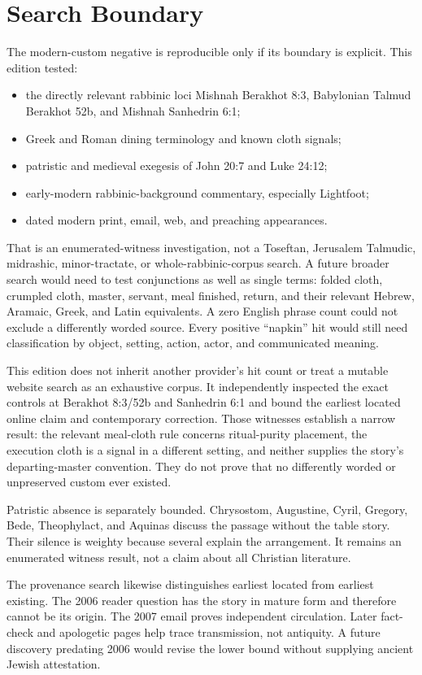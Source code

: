 \section{Search Boundary}

The modern-custom negative is reproducible only if its boundary is explicit.
This edition tested:

\begin{itemize}
\item the directly relevant rabbinic loci Mishnah Berakhot 8:3, Babylonian
Talmud Berakhot 52b, and Mishnah Sanhedrin 6:1;
\item Greek and Roman dining terminology and known cloth signals;
\item patristic and medieval exegesis of John 20:7 and Luke 24:12;
\item early-modern rabbinic-background commentary, especially Lightfoot;
\item dated modern print, email, web, and preaching appearances.
\end{itemize}

That is an enumerated-witness investigation, not a Toseftan, Jerusalem
Talmudic, midrashic, minor-tractate, or whole-rabbinic-corpus search. A future
broader search would need to test conjunctions as well as single terms:
folded cloth, crumpled cloth, master, servant, meal finished, return, and their
relevant Hebrew, Aramaic, Greek, and Latin equivalents. A zero English phrase
count could not exclude a differently worded source. Every positive
``napkin'' hit would still need classification by object, setting, action,
actor, and communicated meaning.

This edition does not inherit another provider's hit count or treat a mutable
website search as an exhaustive corpus. It independently inspected the exact
controls at Berakhot 8:3/52b and Sanhedrin 6:1 and bound the earliest
located online claim and contemporary correction. Those witnesses establish a
narrow result: the relevant meal-cloth rule concerns ritual-purity placement,
the execution cloth is a signal in a different setting, and neither supplies
the story's departing-master convention. They do not prove that no differently
worded or unpreserved custom ever existed.

Patristic absence is separately bounded. Chrysostom, Augustine, Cyril,
Gregory, Bede, Theophylact, and Aquinas discuss the passage without the table
story. Their silence is weighty because several explain the arrangement.
It remains an enumerated witness result, not a claim about all Christian
literature.

The provenance search likewise distinguishes earliest located from earliest
existing. The 2006 reader question has the story in mature form and therefore
cannot be its origin. The 2007 email proves independent circulation. Later
fact-check and apologetic pages help trace transmission, not antiquity. A
future discovery predating 2006 would revise the lower bound without supplying
ancient Jewish attestation.

